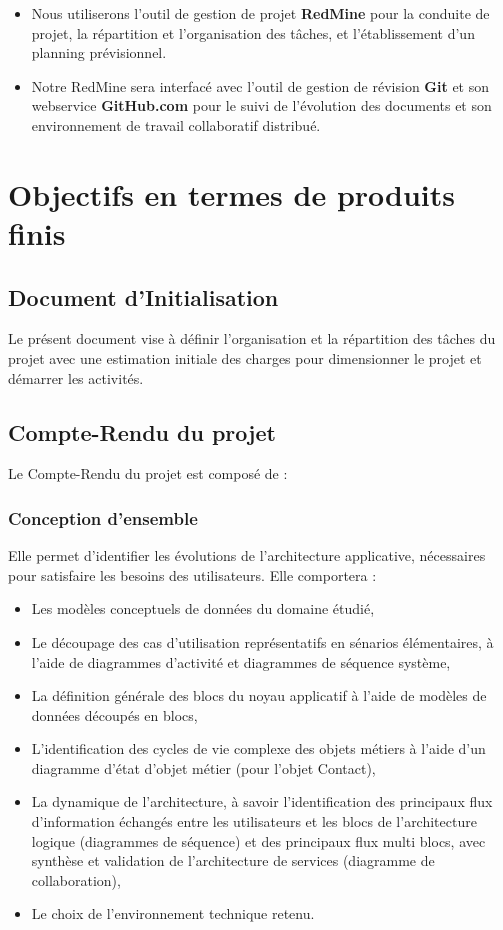 \begin{itemize}
\item Nous utiliserons l'outil de gestion de projet \textbf{RedMine} pour la conduite de projet, la répartition et l'organisation des tâches, et l'établissement d'un planning prévisionnel.
\item Notre RedMine sera interfacé avec l'outil de gestion de révision \textbf{Git} et son webservice \textbf{GitHub.com} pour le suivi de l'évolution des documents et son environnement de travail collaboratif distribué.
\end{itemize}

\section{Objectifs en termes de produits finis}

\subsection{Document d'Initialisation}

Le présent document vise à définir l'organisation et la répartition des tâches du projet avec une estimation initiale des charges pour dimensionner le projet et démarrer les activités.

\subsection{Compte-Rendu du projet}

Le Compte-Rendu du projet est composé de :

\subsubsection{Conception d'ensemble} Elle permet d'identifier les évolutions de l'architecture applicative, nécessaires pour satisfaire les besoins des utilisateurs. Elle comportera :

\begin{itemize}
\item Les modèles conceptuels de données du domaine étudié,
\item Le découpage des cas d'utilisation représentatifs en sénarios élémentaires, à l'aide de diagrammes d'activité et diagrammes de séquence système,
\item La définition générale des blocs du noyau applicatif à l'aide de modèles de données découpés en blocs,
\item L'identification des cycles de vie complexe des objets métiers à l'aide d'un diagramme d'état d'objet métier (pour l'objet Contact),
\item La dynamique de l'architecture, à savoir l'identification des principaux flux d'information échangés entre les utilisateurs et les blocs de l'architecture logique (diagrammes de séquence) et des principaux flux multi blocs, avec synthèse et validation de l'architecture de services (diagramme de collaboration),
\item Le choix de l'environnement technique retenu.
\end{itemize}

